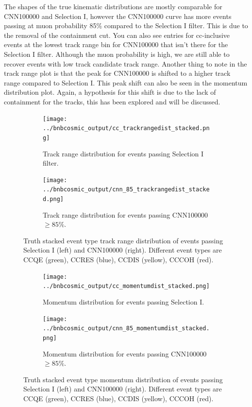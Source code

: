 The shapes of the true kinematic distributions are mostly comparable for CNN100000 and Selection I, however the CNN100000 curve has more events passing at muon probability 85\% compared to the Selection I filter. This is due to the removal of the containment cut. You can also see entries for cc-inclusive events at the lowest track range bin for CNN100000 that isn't there for the Selection I filter. Although the muon probability is high, we are still able to recover events with low track candidate track range. Another thing to note in the track range plot is that the peak for CNN100000 is shifted to a higher track range compared to Selection I. This peak shift can also be seen in the momentum distribution plot. Again, a hypothesis for this shift is due to the lack of containment for the tracks, this has been explored and will be discussed. 

\begin{figure}[htp!]
\centering
	\begin{subfigure}[b]{.475\textwidth}
	\centering
		\texttt{[image: ../bnbcosmic\_output/cc\_trackrangedist\_stacked.png]}
		\caption{Track range distribution for events passing Selection I filter.} 
		\label{fig:cctrackstacked}
	\end{subfigure}
	\quad
	\begin{subfigure}[b]{.475\textwidth}
	\centering
		\texttt{[image: ../bnbcosmic\_output/cnn\_85\_trackrangedist\_stacked.png]}
		\caption{Track range distribution for events passing CNN100000 $\geq 85\%$.} 
		\label{fig:cnn85trackstacked}
	\end{subfigure}
\caption{Truth stacked event type track range distribution of events passing Selection I (left) and CNN100000 (right). Different event types are CCQE (green), CCRES (blue), CCDIS (yellow), CCCOH (red).}
\label{fig:trackstacked}
\end{figure}

\begin{figure}[htp!]
\centering
	\begin{subfigure}[b]{.475\textwidth}
	\centering
		\texttt{[image: ../bnbcosmic\_output/cc\_momentumdist\_stacked.png]}
		\caption{Momentum distribution for events passing Selection I.} 
		\label{fig:ccmomentumstacked}
	\end{subfigure}
	\quad
	\begin{subfigure}[b]{.475\textwidth}
	\centering
		\texttt{[image: ../bnbcosmic\_output/cnn\_85\_momentumdist\_stacked.png]}
		\caption{Momentum distribution for events passing CNN100000 $\geq 85\%$.} 
		\label{fig:cnn85momentumstacked}
	\end{subfigure}
\caption{Truth stacked event type momentum distribution of events passing Selection I (left) and CNN100000 (right). Different event types are CCQE (green), CCRES (blue), CCDIS (yellow), CCCOH (red).}
\label{fig:momentumstacked}
\end{figure}


